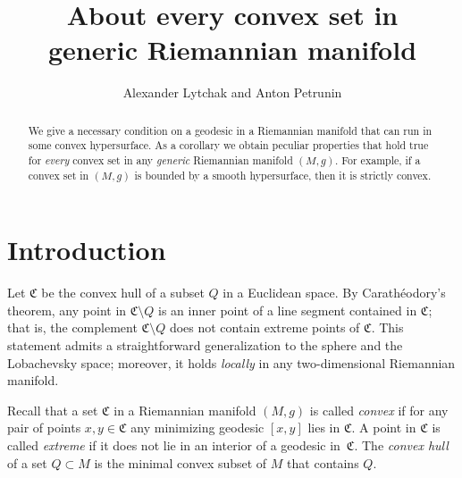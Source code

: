 \documentclass[a4paper,10pt]{article}
\def\thetitle{About every convex set in\\ generic Riemannian manifold}
\begin{document}

\title{\thetitle}
\author{Alexander Lytchak and Anton Petrunin}
\date{}
\maketitle

\begin{abstract}
We give a necessary condition on a geodesic in a Riemannian manifold that can run in some convex hypersurface.
As a corollary we obtain peculiar properties that hold true for \emph{every} convex set in any \emph{generic} Riemannian manifold $(M,g)$.
For example, if a convex set in $(M,g)$ is bounded by a smooth hypersurface, then it is strictly convex.
\end{abstract}








\section{Introduction}
Let $\mathfrak{C}$ be the convex hull of a subset $Q$ in a Euclidean space.
By Carathéodory's theorem, any point in $\mathfrak{C}\setminus Q$ is an inner point of a line segment contained in $\mathfrak{C}$;
that is, the complement $\mathfrak{C} \setminus Q$ does not contain extreme points of $\mathfrak{C}$.
This statement admits a straightforward generalization to the sphere and the  Lobachevsky space; moreover, it 
holds \emph{locally} in any two-dimensional Riemannian manifold.

Recall that a set $\mathfrak{C}$ in a Riemannian manifold $(M,g)$ is called \emph{convex} if for any pair of points $x,y\in \mathfrak{C}$ any minimizing geodesic $[x,y]$ lies in $\mathfrak{C}$.
A point in $\mathfrak{C}$ is called \emph{extreme} if it does not lie in an interior of a geodesic in~$\mathfrak{C}$.
The \emph{convex hull} of a set $Q\subset M$ is the minimal convex subset of $M$  that contains $Q$.
\end{document}
